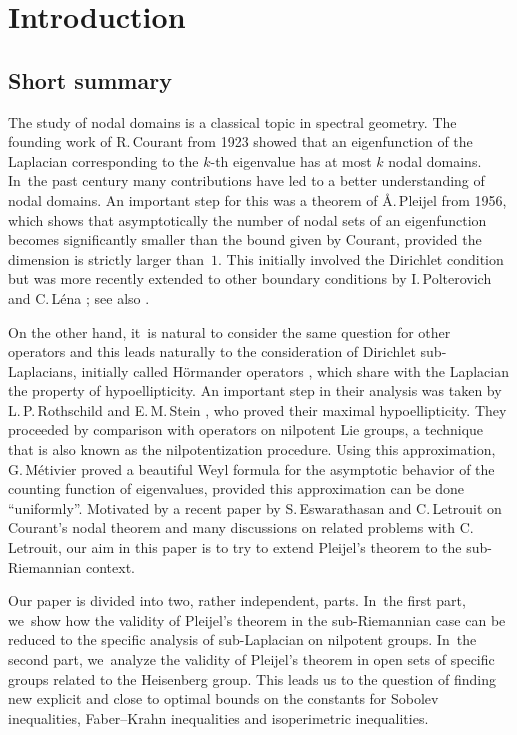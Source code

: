 \section{Introduction}\label{s0}

\subsection{Short summary}
The study of nodal domains is a classical topic in spectral geometry. The founding work of R.\,Courant \cite{CH} from 1923 showed that an eigenfunction of the Laplacian corresponding to the $k$-th eigenvalue has at most $k$ nodal domains. In~the past century many contributions have led to a better understanding of nodal domains. An important step for this was a theorem of \AA.\,Pleijel \cite{Pl} from 1956, which shows that asymptotically the number of nodal sets of an eigenfunction becomes significantly smaller than the bound given by Courant, provided the dimension is strictly larger than~$1$. This initially involved the Dirichlet condition but was more recently extended to other boundary conditions by I.\,Polterovich \cite{Po} and C.\,Léna \cite{Le}; see also \cite{DFV}.

On the other hand, it~is natural to consider the same question for other operators and this leads naturally to the consideration of Dirichlet sub-Laplacians, initially called Hörmander operators \cite{Ho}, which share with the Laplacian the property of hypoellipticity. An important step in
their analysis was taken by L.\,P.\,Rothschild and E.\,M.\,Stein \cite{RS}, who proved their maximal hypoellipticity. They proceeded by comparison with operators on nilpotent Lie groups, a technique that is also known as the nilpotentization procedure. Using this approximation, G.\,Métivier \cite{Me} proved a beautiful Weyl formula for the asymptotic behavior of the counting function of eigenvalues, provided this approximation can be done ``uniformly''. Motivated by a recent paper \cite{EL} by S.\,Eswarathasan and C.\,Letrouit on Courant's nodal theorem and many discussions on related problems with C.\,Letrouit, our aim in this paper is to try to extend Pleijel's theorem to the sub-Riemannian context.

Our paper is divided into two, rather independent, parts. In~the first part, we~show how the validity of Pleijel's theorem in the sub-Riemannian case can be reduced to the specific analysis of sub-Laplacian on nilpotent groups. In~the second part, we~analyze the validity of Pleijel's theorem in open sets of specific groups related to the Heisenberg group. This leads us to the question of finding new explicit and close to optimal bounds on the constants for Sobolev inequalities, Faber--Krahn inequalities and isoperimetric inequalities.

